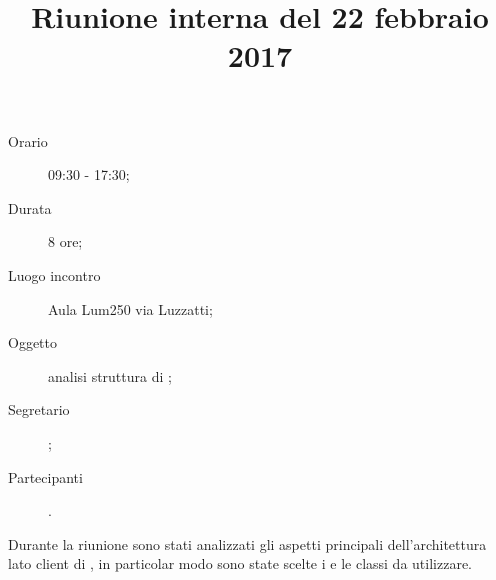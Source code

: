 


\author{\LS}
\supervisor{\LB}
\title{Riunione interna del 22 febbraio 2017}



\maketitle

\begin{description}
	\item[Orario] 09:30 - 17:30;
	\item[Durata] 8 ore;
	\item[Luogo incontro] Aula Lum250 via Luzzatti;
	\item[Oggetto] analisi struttura  di \proj{};
	\item[Segretario] \LS; 
	\item[Partecipanti] \ALL.
\end{description}
Durante la riunione sono stati analizzati gli aspetti principali dell'architettura lato client di \proj{}, in particolar modo sono state scelte i  e le classi da utilizzare.

